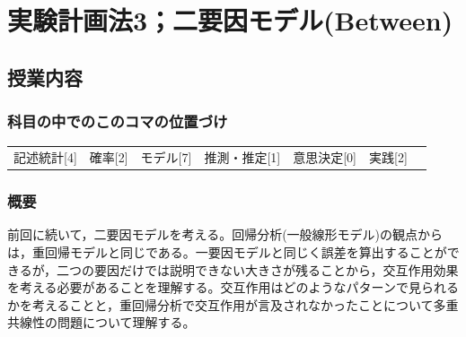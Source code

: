 \section{実験計画法3；二要因モデル(Between)}
\label{lesson13}

\subsection{授業内容}
\subsubsection{科目の中でのこのコマの位置づけ}
\begin{tabular}[t]{ccccccc}
    記述統計[4] & 確率[2] & モデル[7] & 推測・推定[1] & 意思決定[0] & 実践[2]
\end{tabular}
\subsubsection{概要}
前回に続いて，二要因モデルを考える。回帰分析(一般線形モデル)の観点からは，重回帰モデルと同じである。一要因モデルと同じく誤差を算出することができるが，二つの要因だけでは説明できない大きさが残ることから，交互作用効果を考える必要があることを理解する。交互作用はどのようなパターンで見られるかを考えることと，重回帰分析で交互作用が言及されなかったことについて多重共線性の問題について理解する。
